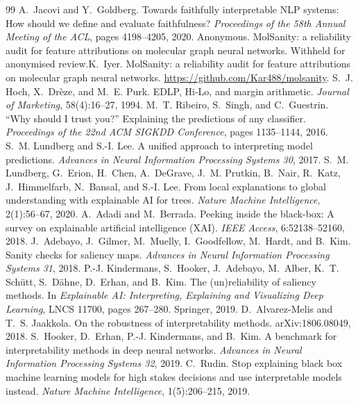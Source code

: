 \begin{thebibliography}{99}
\footnotesize
\setlength{\itemsep}{1.5pt}\setlength{\parskip}{0pt}
 A.~Jacovi and Y.~Goldberg. Towards faithfully interpretable NLP systems: How should we define and evaluate faithfulness? \emph{Proceedings of the 58th Annual Meeting of the ACL}, pages 4198--4205, 2020.
 \iftmlr Anonymous. MolSanity: a reliability audit for feature attributions on molecular graph neural networks. Withheld for anonymised review.\else K.~Iyer. MolSanity: a reliability audit for feature attributions on molecular graph neural networks. \url{https://github.com/Kar488/molsanity}.\fi
{} S.~J. Hoch, X.~Dr\`eze, and M.~E. Purk. EDLP, Hi-Lo, and margin arithmetic. \emph{Journal of Marketing}, 58(4):16--27, 1994.
 M.~T. Ribeiro, S.~Singh, and C.~Guestrin. ``Why should I trust you?'' Explaining the predictions of any classifier. \emph{Proceedings of the 22nd ACM SIGKDD Conference}, pages 1135--1144, 2016.
 S.~M. Lundberg and S.-I. Lee. A unified approach to interpreting model predictions. \emph{Advances in Neural Information Processing Systems 30}, 2017.
 S.~M. Lundberg, G.~Erion, H.~Chen, A.~DeGrave, J.~M. Prutkin, B.~Nair, R.~Katz, J.~Himmelfarb, N.~Bansal, and S.-I. Lee. From local explanations to global understanding with explainable AI for trees. \emph{Nature Machine Intelligence}, 2(1):56--67, 2020.
 A.~Adadi and M.~Berrada. Peeking inside the black-box: A survey on explainable artificial intelligence (XAI). \emph{IEEE Access}, 6:52138--52160, 2018.
 J.~Adebayo, J.~Gilmer, M.~Muelly, I.~Goodfellow, M.~Hardt, and B.~Kim. Sanity checks for saliency maps. \emph{Advances in Neural Information Processing Systems 31}, 2018.
 P.-J. Kindermans, S.~Hooker, J.~Adebayo, M.~Alber, K.~T. Sch\"utt, S.~D\"ahne, D.~Erhan, and B.~Kim. The (un)reliability of saliency methods. In \emph{Explainable AI: Interpreting, Explaining and Visualizing Deep Learning}, LNCS 11700, pages 267--280. Springer, 2019.
 D.~Alvarez-Melis and T.~S. Jaakkola. On the robustness of interpretability methods. arXiv:1806.08049, 2018.
 S.~Hooker, D.~Erhan, P.-J. Kindermans, and B.~Kim. A benchmark for interpretability methods in deep neural networks. \emph{Advances in Neural Information Processing Systems 32}, 2019.
 C.~Rudin. Stop explaining black box machine learning models for high stakes decisions and use interpretable models instead. \emph{Nature Machine Intelligence}, 1(5):206--215, 2019.

\end{thebibliography}
